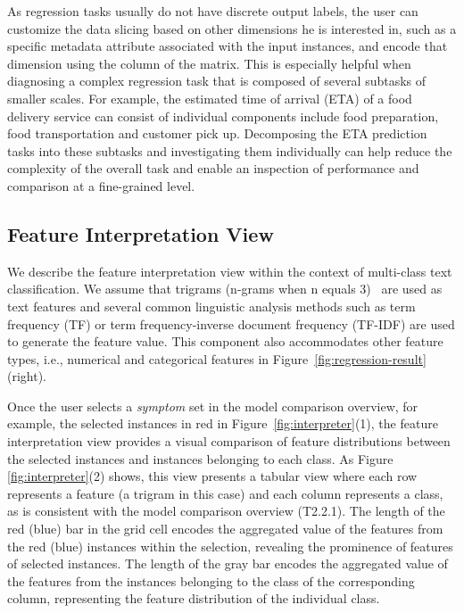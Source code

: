 \documentclass[preprint,journal]{vgtc}       %
\begin{document}
As regression tasks usually do not have discrete output labels, the user can customize the data slicing based on other dimensions he is interested in, such as a specific metadata attribute associated with the input instances, and encode that dimension using the column of the matrix. This is especially helpful when diagnosing a complex regression task that is composed of several subtasks of smaller scales. For example, the estimated time of arrival (ETA) of a food delivery service can consist of individual components include food preparation, food transportation and customer pick up. Decomposing the ETA prediction tasks into these subtasks and investigating them individually can help reduce the complexity of the overall task and enable an inspection of performance and comparison at a fine-grained level.

\subsection{Feature Interpretation View}
We describe the feature interpretation view within the context of multi-class text classification. We assume that trigrams (n-grams when n equals 3)~\cite{manning1999foundations} are used as text features and several common linguistic analysis methods such as term frequency (TF) or term frequency-inverse document frequency (TF-IDF) are used to generate the feature value. This component also accommodates other feature types, i.e., numerical and categorical features in Figure~\ref{fig:regression-result}(right).

Once the user selects a \textit{symptom} set in the model comparison overview, for example, the selected instances in red in Figure~\ref{fig:interpreter}(1), the feature interpretation view provides a visual comparison of feature distributions between the selected instances and instances belonging to each class. As Figure \ref{fig:interpreter}(2) shows, this view presents a tabular view where each row represents a feature (a trigram in this case) and each column represents a class, as is consistent with the model comparison overview (T2.2.1). The length of the red (blue) bar in the grid cell encodes the aggregated value of the features from the red (blue) instances within the selection,  revealing the prominence of features of selected instances.
The length of the gray bar encodes the aggregated value of the features from the instances belonging to the class of the corresponding column, representing the feature distribution of the individual class.
\end{document}
